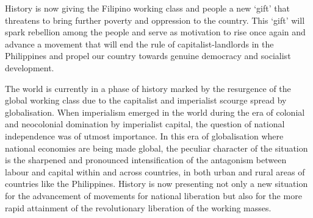 History is now giving the Filipino working class and people a new `gift' 
that threatens to bring further poverty and oppression to the country. 
This `gift' will spark rebellion among the people and serve as motivation 
to rise once again and advance a movement that will end the rule 
of capitalist-landlords in the Philippines and propel our country towards 
genuine democracy and socialist development.

The world is currently in a phase of history marked by the resurgence 
of the global working class due to the capitalist and imperialist scourge 
spread by globalisation. 
When imperialism emerged in the world during the era of colonial and neocolonial 
domination by imperialist capital, the question of national independence was 
of utmost importance. 
In this era of globalisation where national economies are being made global, 
the peculiar character of the situation is the sharpened and pronounced 
intensification of the antagonism between labour and capital 
within and across countries, in both urban and rural areas of countries 
like the Philippines. 
History is now presenting not only a new situation for the advancement 
of movements for national liberation but also for the more rapid attainment 
of the revolutionary liberation of the working masses.

